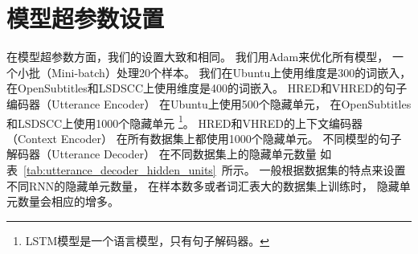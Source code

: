 \section{模型超参数设置}\label{sec:model_hparams}
在模型超参数方面，我们的设置大致和相同。
我们用Adam来优化所有模型，
一个小批（Mini-batch）处理20个样本。
我们在Ubuntu上使用维度是300的词嵌入，
在OpenSubtitles和LSDSCC上使用维度是400的词嵌入。
HRED和VHRED的句子编码器（Utterance Encoder）
在Ubuntu上使用500个隐藏单元，
在OpenSubtitles和LSDSCC上使用1000个隐藏单元
\footnote{LSTM模型是一个语言模型，只有句子解码器。}。
HRED和VHRED的上下文编码器（Context Encoder）
在所有数据集上都使用1000个隐藏单元。
不同模型的句子解码器（Utterance Decoder）
在不同数据集上的隐藏单元数量
如表~\ref{tab:utterance_decoder_hidden_units}~所示。
一般根据数据集的特点来设置不同RNN的隐藏单元数量，
在样本数多或者词汇表大的数据集上训练时，
隐藏单元数量会相应的增多。

